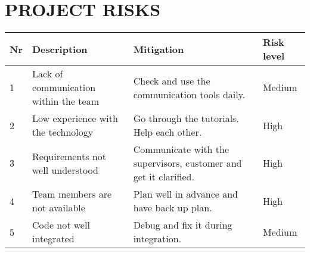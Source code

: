 \section{PROJECT RISKS}
\begin{center}
	\begin{tabular} { | m{1cm} | m{4cm} | m{5cm} | m{2cm} | }
		\hline
		\textbf{Nr} & \textbf{Description} & \textbf{Mitigation} & \textbf{Risk level}\\
		\hline
		1 & Lack of communication within the team & Check and use the communication tools daily. & Medium\\
		\hline
		2 & Low experience with the technology & Go through the tutorials. Help each other. & High\\
		\hline
		3 & Requirements not well understood & Communicate with the supervisors, customer and get it clarified. & High\\
		\hline
		4 & Team members are not available & Plan well in advance and have back up plan. & High\\
		\hline
		5 & Code not well integrated & Debug and fix it during integration. & Medium\\
		\hline
	\end{tabular}
\end{center}